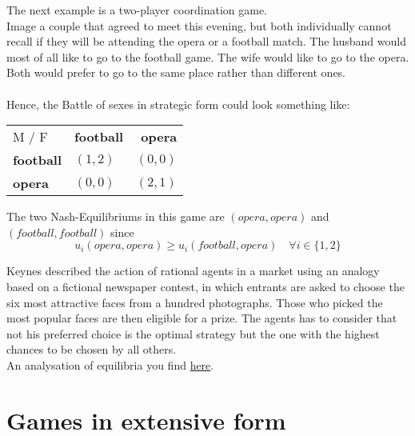 \begin{example} \label{battleofthesexes} 
		The next example is a two-player coordination game. \\
		Image a couple that agreed to meet this evening, but both individually cannot recall if they will be attending the opera or a football match. The husband would most of all like to go to the football game. The wife would like to go to the opera. Both would prefer to go to the same place rather than different ones. \\ \\
		Hence, the Battle of sexes in strategic form could look something like:
		
		\begin{center}
			\begin{tabular}{|l|l|r|}
				\hline\hline
  					M / F & \textbf{football} & \textbf{opera} \\
         				\cline{1-3}
   					\textbf{football} & $(1, 2)$ & $(0, 0)$ 	\arrayrulewidth2pt \\
            			\cline{1-3}
   					\textbf{opera} & $(0, 0)$ & $(2, 1)$ \\ \hline\hline
			\end{tabular}	
		\end{center}
		
		The two Nash-Equilibriums in this game are $(opera, opera)$ and $(football, football)$ since
		\[ u_{i}(opera, opera) \geq u_{i}(football, opera) \quad \forall i \in \{ 1, 2 \} \]
\end{example}

\begin{example}  \label{Beauty-Contest}
Keynes described the action of rational agents in a market using an analogy based on a fictional newspaper contest, in which entrants are asked to choose the six most attractive faces from a hundred photographs. Those who picked the most popular faces are then eligible for a prize. The agents has to consider that not his preferred choice is the optimal strategy but the one with the highest chances to be chosen by all others. \\
	An analysation of equilibria you find \hyperref[Guessing-Game]{here}.
\end{example}

\section{Games in extensive form}

